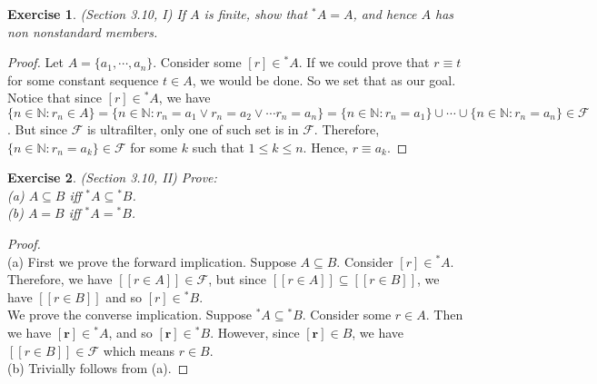 \documentclass[a4paper, 11pt, openany]{book}
\theoremstyle{plain}
\newtheorem{exercise}{Exercise}[chapter]
\theoremstyle{plain}
\newcommand{\mb}{\mathbf}
\newcommand{\mc}{\mathcal}
\newcommand{\N}{\mathbb{N}}
\begin{document}
  \begin{exercise} (Section 3.10, I)
    If $A$ is finite, show that ${}^*A=A$, and hence $A$ has non nonstandard members.
  \end{exercise}
  \begin{proof}
    Let $A=\{a_1,\cdots, a_n\}$. Consider some $[r] \in {}^* A$. If we could prove that $r \equiv t$ for some constant sequence $t \in A$, we would be done. So we set that as our goal. Notice that since $[r] \in {}^* A$, we have $\{ n \in \N: r_n \in A\}= \{n \in \N: r_n=a_1 \lor r_n=a_2 \lor \cdots r_n=a_n\}=\{n \in \N: r_n=a_1\} \cup \cdots \cup \{n \in \N:r_n=a_n\} \in \mc{F}$. But since $\mc{F}$ is ultrafilter, only one of such set is in $\mc{F}$. Therefore, $\{n \in \N: r_n=a_k\} \in \mc{F}$ for some $k$ such that $1 \leq k \leq n$. Hence, $r \equiv a_k$.
  \end{proof}

  \begin{exercise}
    (Section 3.10, II) 
    Prove: \\
    (a) $A \subseteq B$ iff ${}^* A \subseteq {}^* B$. \\
    (b) $A=B$ iff ${}^* A = {}^* B$.
  \end{exercise}
  \begin{proof} $ $ \\
    (a) First we prove the forward implication. Suppose $A \subseteq B$. Consider $[r] \in {}^* A$. Therefore, we have $[[r \in A]] \in \mc{F}$, but since $[[r \in A]] \subseteq [[r \in B]]$, we have $[[r \in B]]$ and so $[r] \in {}^* B$. \\
    We prove the converse implication. Suppose ${}^* A \subseteq {}^* B$. Consider some $r \in A$. Then we have $[\mb{r}] \in {}^* A$, and so $[\mb{r}] \in {}^*B$. However, since $[{\mb{r}}] \in B$, we have $[[r \in B]] \in \mc{F}$ which means $r \in B$. \\

    (b) Trivially follows from (a).
  \end{proof}
\end{document}
